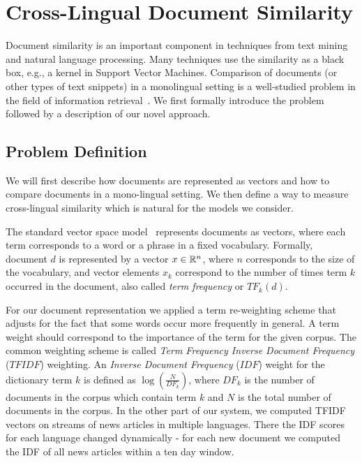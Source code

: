 %
\chapter{Cross-Lingual Document Similarity}\label{chap:crosslingual}

Document similarity is an important component in techniques from text mining and natural language processing.
Many techniques use the similarity as a black box, e.g., a kernel in Support Vector Machines.
Comparison of documents (or other types of text snippets) in a monolingual setting is a
well-studied problem in the field of information retrieval~\cite{Salton88term-weightingapproaches}.
We first formally introduce the problem followed by a description of our novel approach.

\section{Problem Definition}\label{chap:crosslingual:problem}
We will first describe how documents are represented as vectors and how to compare documents in
a mono-lingual setting. We then define a way to measure cross-lingual similarity which is natural
for the models we consider.

The standard vector space model~\cite{Salton88term-weightingapproaches} represents documents as
vectors, where each term corresponds to a word or a phrase in a fixed vocabulary. Formally,
document $d$ is represented by a vector $x \in \mathbb{R}^n$, where $n$ corresponds to the size
of the vocabulary, and vector elements $x_k$ correspond to the number of times term $k$
occurred in the document, also called \emph{term frequency} or $TF_k(d)$.

For our document representation we applied a term re-weighting scheme that adjusts
for the fact that some words occur more frequently in general. A term weight should correspond to the importance of the term for the given corpus. The common weighting scheme is called \emph{Term Frequency Inverse Document Frequency} ($TFIDF$) weighting. An \emph{Inverse Document Frequency} ($IDF$) weight for the dictionary term $k$ is defined as $\log\left( \frac{N}{DF_k} \right)$, where $DF_k$ is the number of documents in the corpus which contain term $k$ and $N$ is the total number of documents in the corpus. In the other part of our system, we computed TFIDF vectors on streams
of news articles in multiple languages. There the IDF scores for each language changed
dynamically - for each new document we computed the IDF of all news articles within
a ten day window.

